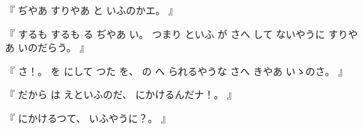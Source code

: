 %
『
ぢやあ
すりやあ
と%
いふのかエ。
』

%
『
するも
するも
る
ぢやあ
い。
%
つまり
といふ
が
さへ
して
ないやうに
すりやあ
いのだらう。
』

%
『
さ！。
%
を
にして
つた
を、
%
の
へ
られるやうな
さへ
きやあ
いゝのさ。%
』

%
『
だから
は
えといふのだ、
%
にかけるんだナ！。
』

%
『
にかけるつて、
%
いふやうに？。
』

